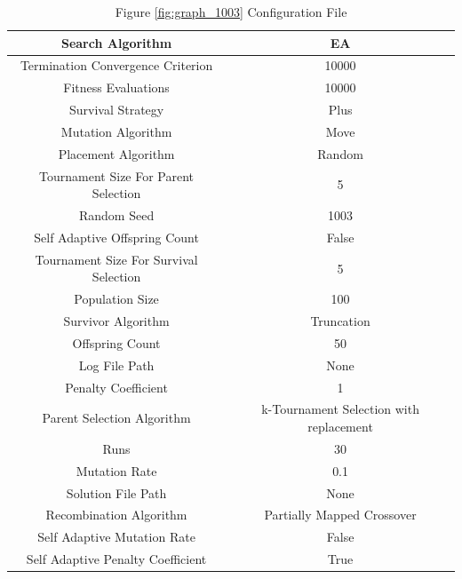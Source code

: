 \documentclass{standalone}
\begin{document}
\begin{table}[!htb]
	\centering
	\caption{Figure \ref{fig:graph_1003} Configuration File}
	\label{tab:graph_1003}
	\begin{tabular}{| c | c |}
		\hline
		Search Algorithm		& EA		 \\
		\hline
		Termination Convergence Criterion		& 10000		 \\
		\hline
		Fitness Evaluations		& 10000		 \\
		\hline
		Survival Strategy		& Plus		 \\
		\hline
		Mutation Algorithm		& Move		 \\
		\hline
		Placement Algorithm		& Random		 \\
		\hline
		Tournament Size For Parent Selection		& 5		 \\
		\hline
		Random Seed		& 1003		 \\
		\hline
		Self Adaptive Offspring Count		& False		 \\
		\hline
		Tournament Size For Survival Selection		& 5		 \\
		\hline
		Population Size		& 100		 \\
		\hline
		Survivor Algorithm		& Truncation		 \\
		\hline
		Offspring Count		& 50		 \\
		\hline
		Log File Path		& None		 \\
		\hline
		Penalty Coefficient		& 1		 \\
		\hline
		Parent Selection Algorithm		& k-Tournament Selection with replacement		 \\
		\hline
		Runs		& 30		 \\
		\hline
		Mutation Rate		& 0.1		 \\
		\hline
		Solution File Path		& None		 \\
		\hline
		Recombination Algorithm		& Partially Mapped Crossover		 \\
		\hline
		Self Adaptive Mutation Rate		& False		 \\
		\hline
		Self Adaptive Penalty Coefficient		& True		 \\
		\hline
	\end{tabular}
\end{table}
\end{document}
